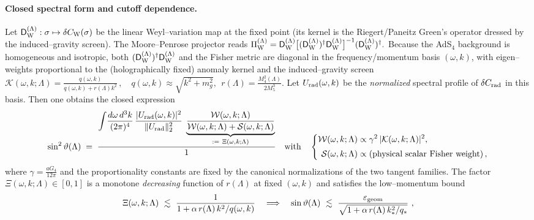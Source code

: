 \documentclass[10pt]{article}
\theoremstyle{definition}
\theoremstyle{plain}
\begin{document}
\paragraph{Closed spectral form and cutoff dependence.}\label{par:uom-main-121}
Let $\mathsf D_{\rm W}^{(\Lambda)}:\sigma\mapsto\delta C_{\rm W}(\sigma)$ be the linear
Weyl–variation map at the fixed point (its kernel is the Riegert/Paneitz Green’s operator dressed
by the induced–gravity screen). The Moore–Penrose projector reads
\(
\Pi_{\rm W}^{(\Lambda)}=
\mathsf D_{\rm W}^{(\Lambda)}\big[(\mathsf D_{\rm W}^{(\Lambda)})^\dagger\mathsf D_{\rm W}^{(\Lambda)}\big]^{-1}
(\mathsf D_{\rm W}^{(\Lambda)})^\dagger.
\)
Because the AdS$_4$ background is homogeneous and isotropic, both
$(\mathsf D_{\rm W}^{(\Lambda)})^\dagger\mathsf D_{\rm W}^{(\Lambda)}$ and the Fisher metric are
diagonal in the frequency/momentum basis $(\omega,k)$, with eigen–weights proportional to the
(holographically fixed) anomaly kernel and the induced–gravity screen
\(
\mathcal K(\omega,k;\Lambda)=\frac{q(\omega,k)}{q(\omega,k)+r(\Lambda)k^2}\,,
\quad q(\omega,k)\!\approx\!\sqrt{k^2+m_g^2},\ \ 
r(\Lambda)=\frac{M_4^2(\Lambda)}{2M_5^3}.
\)
Let $U_{\rm rad}(\omega,k)$ be the \emph{normalized} spectral profile of $\delta C_{\rm rad}$ in
this basis. Then one obtains the closed expression
\begin{equation}
\label{eq:sin-theta-spectral}
\sin^2\vartheta(\Lambda)\;=\;
\frac{\displaystyle
\int\!\frac{d\omega\,d^3k}{(2\pi)^4}\,
\frac{|U_{\rm rad}(\omega,k)|^2}{\|U_{\rm rad}\|_2^2}\;
\underbrace{\frac{\mathcal W(\omega,k;\Lambda)}
{\mathcal W(\omega,k;\Lambda)+\mathcal S(\omega,k;\Lambda)}}_{:=\ \Xi(\omega,k;\Lambda)}
}
{\displaystyle 1}
\quad\text{with}\quad
\left\lbrace\!
\begin{aligned}
\mathcal W(\omega,k;\Lambda)&\propto \gamma^2\,|\mathcal K(\omega,k;\Lambda)|^2,\\[2pt]
\mathcal S(\omega,k;\Lambda)&\propto \text{(physical scalar Fisher weight)}\,,
\end{aligned}\right.
\end{equation}
where $\gamma=\tfrac{aG_4}{12\pi}$ and the proportionality constants are fixed by the canonical
normalizations of the two tangent families. The factor
\(
\Xi(\omega,k;\Lambda)\in[0,1]
\)
is a monotone \emph{decreasing} function of $r(\Lambda)$ at fixed $(\omega,k)$ and satisfies the
low–momentum bound
\begin{equation}
\label{eq:theta-lowk-bound}
\Xi(\omega,k;\Lambda)\ \lesssim\ \frac{1}{1+\alpha\,r(\Lambda)\,k^2/q(\omega,k)}\quad
\Longrightarrow\quad
\sin\vartheta(\Lambda)\ \lesssim\ \frac{\varepsilon_{\rm geom}}{\sqrt{1+\alpha\,r(\Lambda)\,k_\ast^2/q_\ast}}\ ,
\end{equation}
\end{document}
